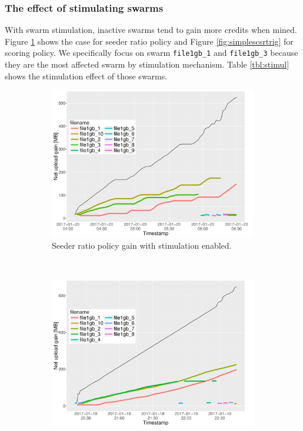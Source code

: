 \subsubsection{The effect of stimulating swarms}
With swarm stimulation, inactive swarms tend to gain more credits when mined. Figure \ref{fig:simplesrtrig} shows the case for seeder ratio policy and Figure \ref{fig:simplescsrtrig} for scoring policy. We specifically focus on swarm \texttt{file1gb\_1} and \texttt{file1gb\_3} because they are the most affected swarm by stimulation mechanism. Table \ref{tbl:stimul} shows the stimulation effect of those swarms.

\begin{figure}[h]
	\begin{adjustwidth}{-1.5cm}{}
		\begin{subfigure}[t]{0.6\textwidth}
			\centering
			\includegraphics[width=\textwidth]{pics/results/simple3_sr_trig.pdf}
			\caption{Seeder ratio policy gain with stimulation enabled.}
			\label{fig:simplesrtrig}
		\end{subfigure}
		~
		\begin{subfigure}[t]{0.6\textwidth}
			\centering
			\includegraphics[width=\textwidth]{pics/results/simple1_scsr_trig.pdf}

\end{subfigure}
\end{adjustwidth}
\end{figure}
